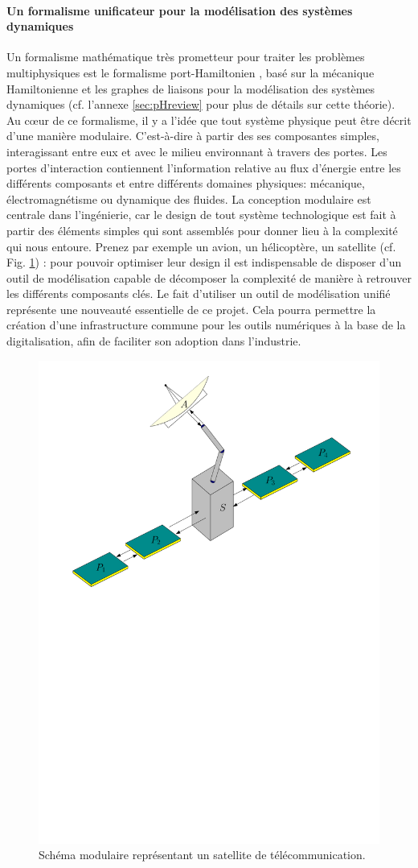 \documentclass[12pt, french]{article}
\begin{document}
	\paragraph{\large Un formalisme unificateur pour la modélisation des systèmes dynamiques\\}
	Un formalisme mathématique très prometteur pour traiter les problèmes multiphysiques est le formalisme port-Hamiltonien \cite{vanderSchaft2002}, basé sur la mécanique Hamiltonienne et les graphes de liaisons pour la modélisation des systèmes dynamiques (cf. l'annexe \ref{sec:pHreview} pour plus de détails sur cette théorie). Au c\oe{}ur de ce formalisme, il y a l'idée que tout système physique peut être décrit d'une manière modulaire. C'est-à-dire à partir des ses composantes simples, interagissant entre eux et avec le milieu environnant à travers des portes. Les portes d'interaction contiennent l'information relative au flux d'énergie entre les différents composants et entre différents domaines physiques: mécanique, électromagnétisme ou dynamique des fluides. La conception modulaire est centrale dans l'ingénierie, car le design de tout système technologique est fait à partir des éléments simples qui sont assemblés pour donner lieu à la complexité qui nous entoure. Prenez par exemple un avion, un hélicoptère, un satellite (cf. Fig. \ref{fig:satellite}) : pour pouvoir optimiser leur design il est indispensable de disposer d'un outil de modélisation capable de décomposer la complexité de manière à retrouver les différents composants clés. Le fait d'utiliser un outil de modélisation unifié représente une nouveauté essentielle de ce projet. Cela pourra permettre la création d'une infrastructure commune pour les outils numériques à la base de la digitalisation, afin de faciliter son adoption dans l'industrie.
	
	\begin{figure}[hb]
		\centering
		\includegraphics[width=.55\textwidth]{satellite.pdf}
		\caption{Schéma modulaire représentant un satellite de télécommunication.}
		\label{fig:satellite}
	\end{figure}
	
\end{document}
